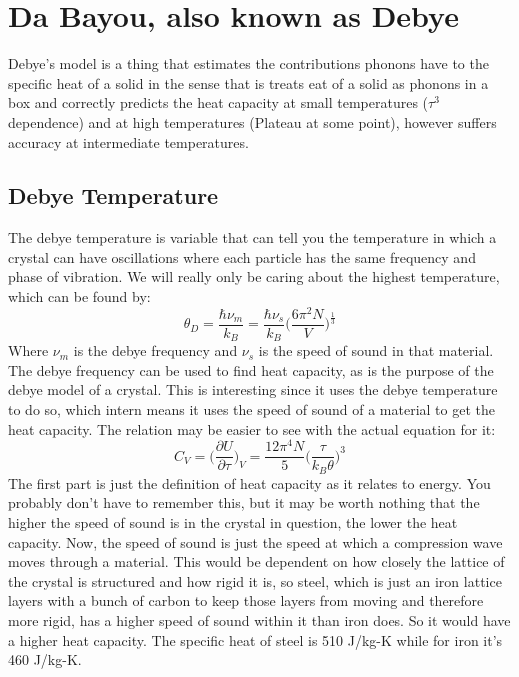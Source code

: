 \documentclass[arial]{article}
\begin{document}
\section*{Da Bayou, also known as Debye}
Debye's model is a thing that estimates the contributions phonons have to the specific heat of a solid in the sense that is treats eat of a solid as phonons in a box and correctly predicts the heat capacity at small temperatures ($\tau^3$ dependence) and at high temperatures (Plateau at some point), however suffers accuracy at intermediate temperatures.

\subsection*{Debye Temperature}
The debye temperature is variable that can tell you the temperature in which a crystal can have oscillations where each particle has the same frequency and phase of vibration. We will really only be caring about the highest temperature, which can be found by:
\begin{equation}
\theta_D=\frac{\hbar\nu_m}{k_B} = \frac{\hbar \nu_s}{k_B}\bigg(\frac{6\pi^2 N}{V}\bigg)^\frac{1}{3}
\end{equation}
Where $\nu_m$ is the debye frequency and $\nu_s$ is the speed of sound in that material. The debye frequency can be used to find heat capacity, as is the purpose of the debye model of a crystal. This is interesting since it uses the debye temperature to do so, which intern means it uses the speed of sound of a material to get the heat capacity. The relation may be easier to see with the actual equation for it:
\begin{equation}
C_V=\bigg(\frac{\partial U}{\partial \tau}\bigg)_V = \frac{12 \pi^4N}{5}\bigg(\frac{\tau}{k_B \theta}\bigg)^3
\end{equation}
The first part is just the definition of heat capacity as it relates to energy. You probably don't have to remember this, but it may be worth nothing that the higher the speed of sound is in the crystal in question, the lower the heat capacity. Now, the speed of sound is just the speed at which a compression wave moves through a material. This would be dependent on how closely the lattice of the crystal is structured and how rigid it is, so steel, which is just an iron lattice layers with a bunch of carbon to keep those layers from moving and therefore more rigid, has a higher speed of sound within it than iron does. So it would have a higher heat capacity. The specific heat of steel is 510 J/kg-K while for iron it's 460 J/kg-K.
\end{document}
